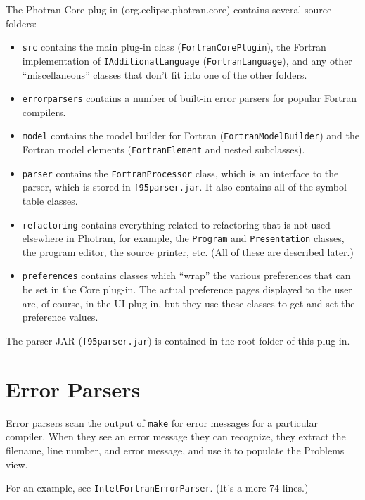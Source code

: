 
The Photran Core plug-in (org.eclipse.photran.core) contains several source
folders:

\begin{itemize}
\item \texttt{src} contains the main plug-in class
(\texttt{FortranCorePlugin}), the Fortran implementation of
\texttt{IAdditionalLanguage} (\texttt{FortranLanguage}), and any other
``miscellaneous'' classes that don't fit into one of the other folders.
\item \texttt{errorparsers} contains a number of built-in error parsers
for popular Fortran compilers.
\item \texttt{model} contains the model builder for Fortran
(\texttt{FortranModelBuilder}) and the Fortran model elements
(\texttt{FortranElement} and nested subclasses).
\item \texttt{parser} contains the \texttt{FortranProcessor} class,
which is an interface to the parser, which is stored in
\texttt{f95parser.jar}.  It also contains all of the symbol table classes.
\item \texttt{refactoring} contains everything related to refactoring
that is not used elsewhere in Photran, for example, the
\texttt{Program} and \texttt{Presentation} classes, the program editor,
the source printer, etc.  (All of these are described later.)
\item \texttt{preferences} contains classes which ``wrap'' the various
preferences that can be set in the Core plug-in.  The actual preference
pages displayed to the user are, of course, in the UI plug-in, but they
use these classes to get and set the preference values.
\end{itemize}

The parser JAR (\texttt{f95parser.jar}) is contained in the root folder
of this plug-in.

\section{Error Parsers}
Error parsers scan the output of \texttt{make} for error messages
for a particular compiler.
When they see an error message they can recognize, they extract the
filename, line number, and error message, and use it to populate the
Problems view.

For an example, see \texttt{IntelFortranErrorParser}.
(It's a mere 74 lines.)

